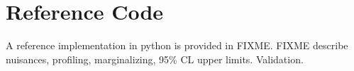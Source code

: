 \section{Reference Code}
\label{sec:reference_code}

A reference implementation in python is provided in FIXME.
FIXME describe nuisances, profiling, marginalizing, 95\% CL upper limits.
Validation.
